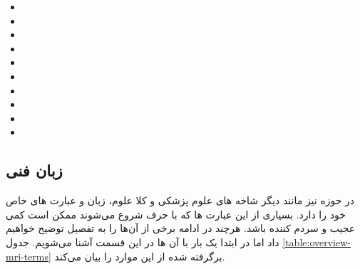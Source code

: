\begin{multicols}{2}
	\footnotesize
	\begin{itemize}
		\item {}
		\item {}
		\item {}
		\item {}
		\item {}
		\item {}
		\item {}
		\item {}
		\item {}
		\item {}
	\end{itemize}
\end{multicols}


\subsection{زبان فنی \mri}
در حوزه \mri نیز مانند دیگر شاخه های علوم پزشکی و کلا علوم، زبان و عبارت های خاص خود را دارد. بسیاری از این عبارت ها که با حرف  شروع می‌شوند ممکن است کمی عجیب و سردم کننده باشد. هرچند در ادامه برخی از آن‌ها را به تفصیل توضیح خواهیم داد اما در ابتدا یک بار با آن ها در این قسمت آشنا می‌شویم. جدول \ref{table:overview-mri-terms}
برگرفته شده از \cite{book:MRIfromPictureToProton}
این موارد را بیان می‌کند.

